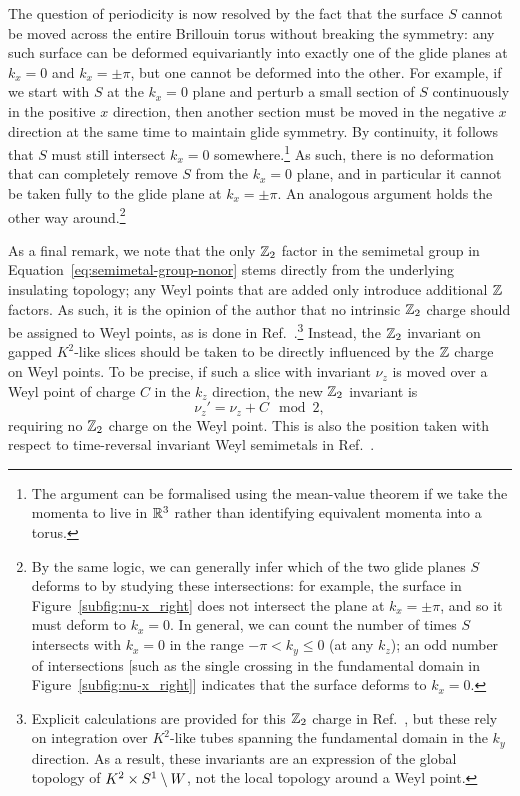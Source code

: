 The question of periodicity is now resolved by the fact that the surface $S$ cannot be moved across the entire Brillouin torus without breaking the symmetry: any such surface can be deformed equivariantly into exactly one of the glide planes at $k_x=0$ and $k_x=\pm\pi$, but one cannot be deformed into the other. For example, if we start with $S$ at the $k_x=0$ plane and perturb a small section of $S$ continuously in the positive $x$ direction, then another section must be moved in the negative $x$ direction at the same time to maintain glide symmetry. By continuity, it follows that $S$ must still intersect $k_x=0$ somewhere.\footnote{
	The argument can be formalised using the mean-value theorem if we take the momenta to live in $\mathbb{R}^3$ rather than identifying equivalent momenta into a torus.}
As such, there is no deformation that can completely remove $S$ from the $k_x=0$ plane, and in particular it cannot be taken fully to the glide plane at $k_x=\pm\pi$. An analogous argument holds the other way around.\footnote{
	By the same logic, we can generally infer which of the two glide planes $S$ deforms to by studying these intersections: for example, the surface in Figure~\ref{subfig:nu-x_right} does not intersect the plane at $k_x=\pm\pi$, and so it must deform to $k_x=0$. In general, we can count the number of times $S$ intersects with $k_x=0$ in the range $-\pi<k_y\leq 0$ (at any $k_z$); an odd number of intersections [such as the single crossing in the fundamental domain in Figure~\ref{subfig:nu-x_right}] indicates that the surface deforms to $k_x=0$.}

As a final remark, we note that the only $\mathbb{Z}_2$ factor in the semimetal group in Equation~\eqref{eq:semimetal-group-nonor} stems directly from the underlying insulating topology; any Weyl points that are added only introduce additional $\mathbb{Z}$ factors. As such, it is the opinion of the author that no intrinsic $\mathbb{Z}_2$ charge should be assigned to Weyl points, as is done in Ref.~\cite{Fonseca-Vaidya_nonorientable}.\footnote{
	Explicit calculations are provided for this $\mathbb{Z}_2$ charge in Ref.~\cite{Fonseca-Vaidya_nonorientable}, but these rely on integration over $K^2$-like tubes spanning the fundamental domain in the $k_y$ direction. As a result, these invariants are an expression of the global topology of $K^2\times S^1\setminus W$, not the local topology around a Weyl point.}
Instead, the $\mathbb{Z}_2$ invariant on gapped $K^2$-like slices should be taken to be directly influenced by the $\mathbb{Z}$ charge on Weyl points. To be precise, if such a slice with invariant $\nu_z$ is moved over a Weyl point of charge $C$ in the $k_z$ direction, the new $\mathbb{Z}_2$ invariant is
\begin{equation*}
	\nu_z' = \nu_z + C \mod 2,
\end{equation*}
requiring no $\mathbb{Z}_2$ charge on the Weyl point. This is also the position taken with respect to time-reversal invariant Weyl semimetals in Ref.~\cite{Thiang_equivariant}.


